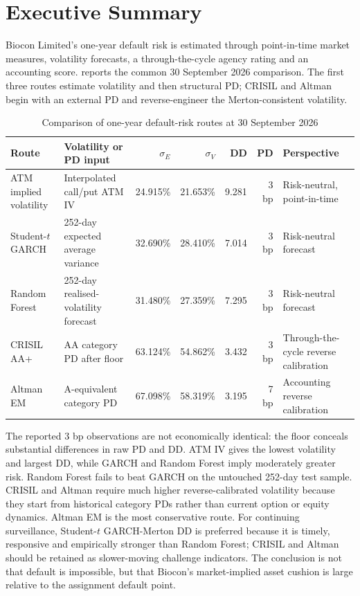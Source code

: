 \documentclass[10pt,a4paper]{article}
\newcommand{\sigE}{\sigma_E}
\newcommand{\sigV}{\sigma_V}
\begin{document}
\clearpage
\tableofcontents
\clearpage

\setcounter{page}{1}
\pagestyle{fancy}

\section{Executive Summary}
Biocon Limited's one-year default risk is estimated through point-in-time market measures, volatility forecasts, a through-the-cycle agency rating and an accounting score.  reports the common 30 September 2026 comparison. The first three routes estimate volatility and then structural PD; CRISIL and Altman begin with an external PD and reverse-engineer the Merton-consistent volatility.

\begin{table}[H]
\centering
\caption{Comparison of one-year default-risk routes at 30 September 2026}
\label{tab:summary}
\scriptsize
\setlength{\tabcolsep}{3.2pt}
\begin{tabularx}{\textwidth}{l l r r r r X}
\toprule
Route & Volatility or PD input & $\sigE$ & $\sigV$ & DD & PD & Perspective\\
\midrule
ATM implied volatility & Interpolated call/put ATM IV & 24.915\% & 21.653\% & 9.281 & 3 bp & Risk-neutral, point-in-time\\
Student-$t$ GARCH & 252-day expected average variance & 32.690\% & 28.410\% & 7.014 & 3 bp & Risk-neutral forecast\\
Random Forest & 252-day realised-volatility forecast & 31.480\% & 27.359\% & 7.295 & 3 bp & Risk-neutral forecast\\
CRISIL AA+ & AA category PD after floor & 63.124\% & 54.862\% & 3.432 & 3 bp & Through-the-cycle reverse calibration\\
Altman EM & A-equivalent category PD & 67.098\% & 58.319\% & 3.195 & 7 bp & Accounting reverse calibration\\
\bottomrule
\end{tabularx}
\end{table}

The reported 3 bp observations are not economically identical: the floor conceals substantial differences in raw PD and DD. ATM IV gives the lowest volatility and largest DD, while GARCH and Random Forest imply moderately greater risk. Random Forest fails to beat GARCH on the untouched 252-day test sample. CRISIL and Altman require much higher reverse-calibrated volatility because they start from historical category PDs rather than current option or equity dynamics. Altman EM is the most conservative route. For continuing surveillance, Student-$t$ GARCH-Merton DD is preferred because it is timely, responsive and empirically stronger than Random Forest; CRISIL and Altman should be retained as slower-moving challenge indicators. The conclusion is not that default is impossible, but that Biocon's market-implied asset cushion is large relative to the assignment default point.
\end{document}
